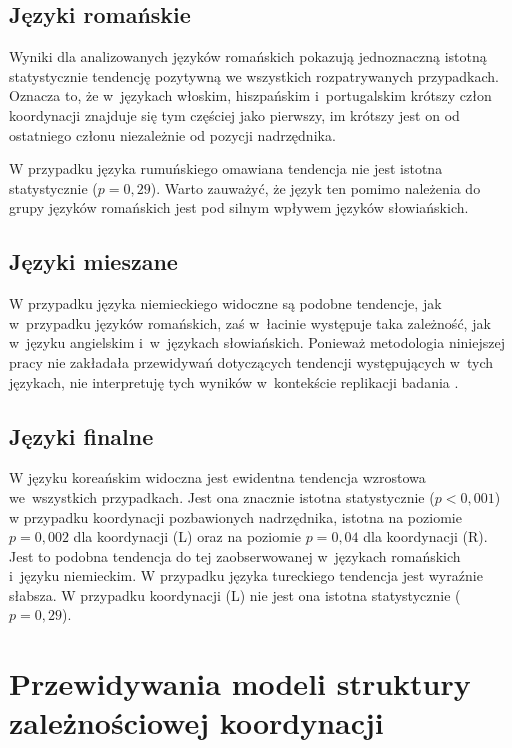 \subsection{Języki romańskie}

Wyniki dla analizowanych języków romańskich pokazują jednoznaczną istotną statystycznie tendencję pozytywną we wszystkich rozpatrywanych przypadkach. Oznacza to, że w~językach włoskim, hiszpańskim i~portugalskim krótszy człon koordynacji znajduje się tym częściej jako pierwszy, im krótszy jest on od ostatniego członu niezależnie od pozycji nadrzędnika. 

W przypadku języka rumuńskiego omawiana tendencja nie jest istotna statystycznie ($p=0,29$). Warto zauważyć, że język ten pomimo należenia do grupy języków romańskich jest pod silnym wpływem języków słowiańskich.

\subsection{Języki mieszane}

W przypadku języka niemieckiego widoczne są podobne tendencje, jak w~przypadku języków romańskich, zaś w~łacinie występuje taka zależność, jak w~języku angielskim i~w~językach słowiańskich. Ponieważ metodologia niniejszej pracy nie zakładała przewidywań dotyczących tendencji występujących w~tych językach, nie interpretuję tych wyników w~kontekście replikacji badania \cite{przepiorkowski2023conjunct}.

\subsection{Języki finalne}

W języku koreańskim widoczna jest ewidentna tendencja wzrostowa we~wszystkich przypadkach. Jest ona znacznie istotna statystycznie ($p<0,001$) w przypadku koordynacji pozbawionych nadrzędnika, istotna na poziomie $p=0,002$ dla koordynacji (L) oraz na poziomie $p=0,04$ dla koordynacji (R). Jest to podobna tendencja do tej zaobserwowanej w~językach romańskich i~języku niemieckim. W przypadku języka tureckiego tendencja jest wyraźnie słabsza. W przypadku koordynacji (L) nie jest ona istotna statystycznie ($p=0,29$).

\section{Przewidywania modeli struktury zależnościowej koordynacji}

